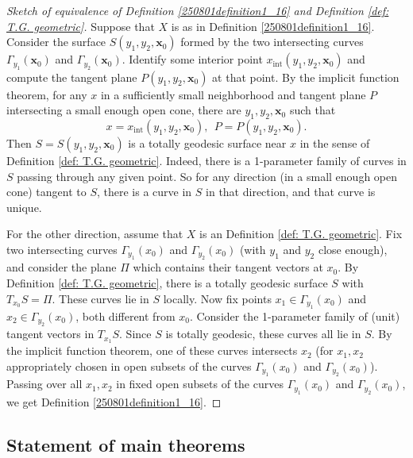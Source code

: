 \documentclass{article}
\numberwithin{equation}{section}
\theoremstyle{plain}
\begin{document}
\begin{proof}[Sketch of equivalence of Definition \ref{250801definition1_16} and Definition \ref{def: T.G. geometric}]
    Suppose that $X$ is as in Definition \ref{250801definition1_16}. Consider the surface $S(y_1,y_2,\mathbf x_0)$ formed by the two intersecting curves $\Gamma_{y_1}(\mathbf x_0)$ and $\Gamma_{y_2}(\mathbf x_0)$. Identify some interior point $x_{\mathrm{int}}(y_1,y_2,\mathbf x_0)$ and compute the tangent plane $P(y_1, y_2, \mathbf x_0)$ at that point. By the implicit function theorem, for any $x$ in a sufficiently small neighborhood and tangent plane $P$ intersecting a small enough open cone, there are $y_1,y_2,\mathbf x_0$ such that
    \begin{equation}
    x = x_{\mathrm{int}}(y_1,y_2, \mathbf x_0), \ \ P = P(y_1,y_2, \mathbf x_0).
    \end{equation}
     Then $S = S(y_1,y_2, \mathbf x_0)$ is a totally geodesic surface near  $x$ in the sense of Definition \eqref{def: T.G. geometric}. 
    Indeed, there is a 1-parameter family of curves in $S$ passing through any given point. So for any direction (in a small enough open cone) tangent to $S$, there is a curve in $S$ in that direction, and that curve is unique. 

    For the other direction, assume that $X$ is an Definition \ref{def: T.G. geometric}. Fix two intersecting curves $\Gamma_{y_1}(x_0)$ and $\Gamma_{y_2}(x_0)$ (with $y_1$ and $y_2$ close enough), and consider the plane $\Pi$ which contains their tangent vectors at $x_0$. By Definition \ref{def: T.G. geometric}, there is a totally geodesic surface $S$ with $T_{x_0} S = \Pi$. These curves lie in $S$ locally.
    Now fix points $x_1 \in \Gamma_{y_1}(x_0)$ and $x_2 \in \Gamma_{y_2}(x_0)$, both different from $x_0$. Consider the 1-parameter family of (unit) tangent vectors in $T_{x_1} S$. Since $S$ is totally geodesic, these curves all lie in $S$. By the implicit function theorem, one of these curves intersects $x_2$ (for $x_1, x_2$ appropriately chosen in open subsets of the curves $\Gamma_{y_1}(x_0)$ and $\Gamma_{y_2}(x_0)$). Passing over all $x_1, x_2$ in fixed open subsets of the curves $\Gamma_{y_1}(x_0)$ and $\Gamma_{y_2}(x_0)$, we get Definition \ref{250801definition1_16}. 
\end{proof}


\subsection{Statement of main theorems}
\end{document}
